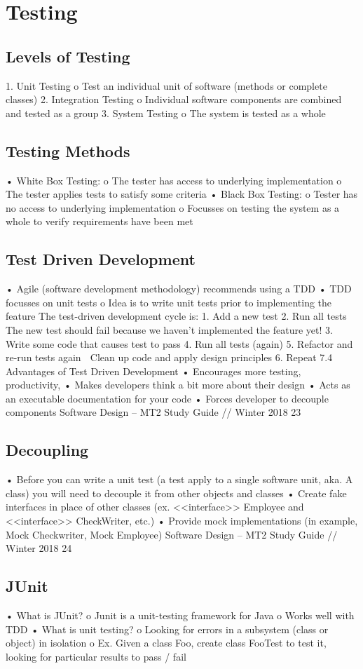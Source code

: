 \documentclass[11pt]{article}
\begin{document}
{{\section{Testing}
\subsection{Levels of Testing}
1. Unit Testing
o Test an individual unit of software (methods or complete classes)
2. Integration Testing
o Individual software components are combined and tested as a group
3. System Testing
o The system is tested as a whole
\subsection{Testing Methods}
• White Box Testing:
o The tester has access to underlying implementation
o The tester applies tests to satisfy some criteria
• Black Box Testing:
o Tester has no access to underlying implementation
o Focusses on testing the system as a whole to verify requirements have been met
\subsection{Test Driven Development}
• Agile (software development methodology) recommends using a TDD
• TDD focusses on unit tests
o Idea is to write unit tests prior to implementing the feature
The test-driven development cycle is:
1. Add a new test
2. Run all tests
 The new test should fail because we haven’t implemented the feature yet!
3. Write some code that causes test to pass
4. Run all tests (again)
5. Refactor and re-run tests again
 Clean up code and apply design principles
6. Repeat
7.4 Advantages of Test Driven Development
• Encourages more testing, productivity,
• Makes developers think a bit more about their design
• Acts as an executable documentation for your code
• Forces developer to decouple components 
Software Design – MT2 Study Guide // Winter 2018 23
\subsection{Decoupling}
• Before you can write a unit test (a test apply to a single software unit, aka. A class) you will need to
decouple it from other objects and classes
• Create fake interfaces in place of other classes (ex. <<interface>> Employee and <<interface>>
CheckWriter, etc.)
• Provide mock implementations (in example, Mock Checkwriter, Mock Employee)
Software Design – MT2 Study Guide // Winter 2018 24
\subsection{JUnit}
• What is JUnit?
o Junit is a unit-testing framework for Java
o Works well with TDD
• What is unit testing?
o Looking for errors in a subsystem (class or object) in isolation
o Ex. Given a class Foo, create class FooTest to test it, looking for particular results to
pass / fail
}}
\end{document}
